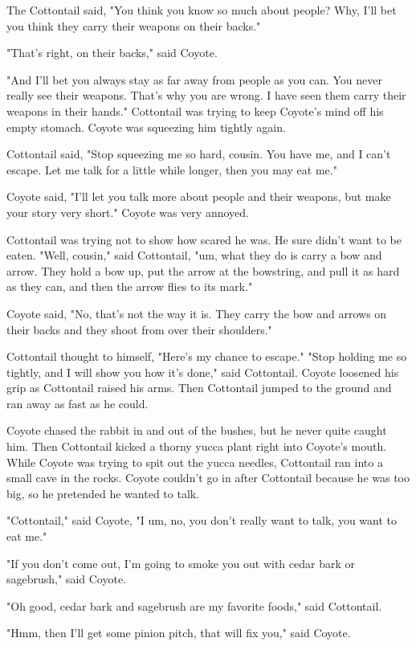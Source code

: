 The Cottontail said, "You think you know so much about people? Why, I'll bet you think they carry their weapons on their backs."

"That's right, on their backs," said Coyote.

"And I'll bet you always stay as far away from people as you can. You never really see their weapons. That's why you are wrong. I have seen them carry their weapons in their hands." Cottontail was trying to keep Coyote's mind off his empty stomach. Coyote was squeezing him tightly again.

Cottontail said, "Stop squeezing me so hard, cousin. You have me, and I can't escape. Let me talk for a little while longer, then you may eat me."

Coyote said, "I'll let you talk more about people and their weapons, but make your story very short." Coyote was very annoyed.

Cottontail was trying not to show how scared he was. He sure didn't want to be eaten. "Well, cousin," said Cottontail, "um, what they do is carry a bow and arrow. They hold a bow up, put the arrow at the bowstring, and pull it as hard as they can, and then the arrow flies to its mark."

Coyote said, "No, that's not the way it is. They carry the bow and arrows on their backs and they shoot from over their shoulders."

Cottontail thought to himself, "Here's my chance to escape." "Stop holding me so tightly, and I will show you how it's done," said Cottontail. Coyote loosened his grip as Cottontail raised his arms. Then Cottontail jumped to the ground and ran away as fast as he could.

Coyote chased the rabbit in and out of the bushes, but he never quite caught him. Then Cottontail kicked a thorny yucca plant right into Coyote's mouth. While Coyote was trying to spit out the yucca needles, Cottontail ran into a small cave in the rocks. Coyote couldn't go in after Cottontail because he was too big, so he pretended he wanted to talk.

"Cottontail," said Coyote, "I um, no, you don't really want to talk, you want to eat me."

"If you don't come out, I'm going to smoke you out with cedar bark or sagebrush," said Coyote.

"Oh good, cedar bark and sagebrush are my favorite foods," said Cottontail.

"Hmm, then I'll get some pinion pitch, that will fix you," said Coyote.

